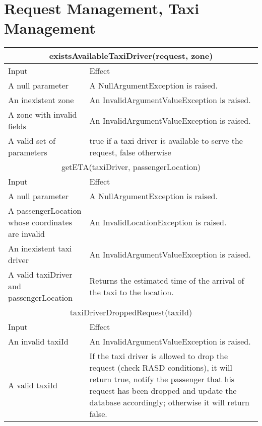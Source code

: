 \documentclass[11pt,oneside,a4paper]{report}
\begin{document}
\section{Request Management, Taxi Management}
\begin{tabular}{p{5cm}|p{6cm}}
\hline
	\multicolumn{2}{c}{existsAvailableTaxiDriver(request, zone)}\\\hline
	Input & Effect \\\hline
	A null parameter &
	A NullArgumentException is raised. \\\hline
	An inexistent zone &
	An InvalidArgumentValueException is raised. \\\hline
	A zone with invalid fields &
	An InvalidArgumentValueException  is raised. \\\hline
	A valid set of parameters &
	true if a taxi driver is available to serve the request, false otherwise \\\hline\hline
	
	\multicolumn{2}{c}{getETA(taxiDriver, passengerLocation)}\\\hline
	Input & Effect \\\hline
	A null parameter &
	A NullArgumentException is raised. \\\hline
	A passengerLocation whose coordinates are invalid &
	An InvalidLocationException is raised. \\\hline
	An inexistent taxi driver &
	An InvalidArgumentValueException is raised. \\\hline
	A valid taxiDriver and passengerLocation &
	Returns the estimated time of the arrival of the taxi to the location. \\\hline\hline

	\multicolumn{2}{c}{taxiDriverDroppedRequest(taxiId)}\\\hline
	Input & Effect \\\hline
	An invalid taxiId &
	An InvalidArgumentValueException is raised. \\\hline
	A valid taxiId &
	If the taxi driver is allowed to drop the request (check RASD conditions), it will return true, notify the passenger that his request has been dropped and update the database accordingly; otherwise it will return false.  \\\hline\hline
	

\end{tabular}
\end{document}
